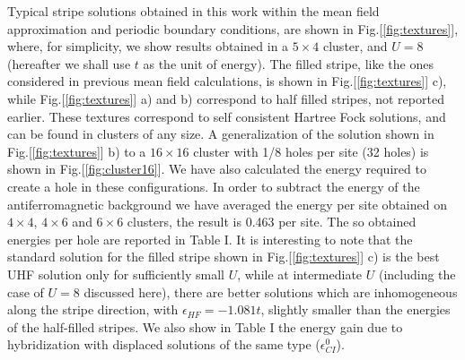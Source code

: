 Typical stripe solutions obtained in this work within the mean field 
approximation and  periodic boundary conditions, are shown in
Fig.[\ref{fig:textures}], where, for simplicity, we show results
obtained in a $5 \times 4$ cluster, and $U = 8$ (hereafter we shall use 
$t$ as the unit of energy). The filled stripe, like the ones
considered in previous mean field calculations, is shown in
Fig.[\ref{fig:textures}] c), while Fig.[\ref{fig:textures}] a) and b)
correspond to half filled stripes, not reported earlier. These textures
correspond to self consistent Hartree Fock solutions, and can be found
in clusters of any size. A generalization of the solution shown in
Fig.[\ref{fig:textures}] b) to a $16 \times 16$ cluster with 1/8
holes per site (32 holes) is shown in Fig.[\ref{fig:cluster16}]. 
We have also calculated the energy required to create a hole in these 
configurations. In order to subtract the energy of the antiferromagnetic 
background we have averaged the energy per site obtained on 
$4 \times 4$, $4 \times 6$ and $6 \times 6$ clusters, the result is  
0.463 per site. The so obtained energies per hole are reported in Table I.  
It is interesting to note that the standard solution for the filled stripe 
shown in Fig.[\ref{fig:textures}] c) is the best UHF solution only for 
sufficiently small $U$,
while at intermediate $U$ (including the case of $U=8$ discussed here), 
there are better solutions which are inhomogeneous along the
stripe direction, with $\epsilon_{HF} = -1.081 t$, slightly smaller
than the energies of the half-filled stripes.
We also show in Table I  the energy gain due
to hybridization with displaced solutions of the same type
($\epsilon^0_{CI}$).



